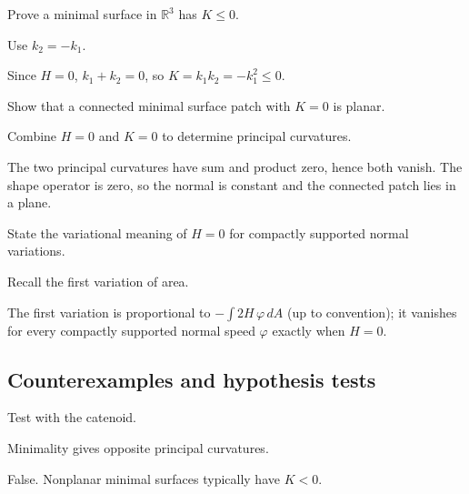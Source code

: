 \begin{exercise}\label{exr:vii19-ped-07}
Prove a minimal surface in \(\mathbb R^3\) has \(K\le0\).
\end{exercise}
\begin{hint}
Use \(k_2=-k_1\).
\end{hint}
\begin{solution}
Since \(H=0\), \(k_1+k_2=0\), so \(K=k_1k_2=-k_1^2\le0\).
\end{solution}

\begin{exercise}[Minimal and \(K=0\)]\label{exr:vii19-ped-08}
Show that a connected minimal surface patch with \(K=0\) is planar.
\end{exercise}
\begin{hint}
Combine \(H=0\) and \(K=0\) to determine principal curvatures.
\end{hint}
\begin{solution}
The two principal curvatures have sum and product zero, hence both vanish.  The shape operator is zero, so the normal is constant and the connected patch lies in a plane.
\end{solution}

\begin{exercise}\label{exr:vii19-ped-09}
State the variational meaning of \(H=0\) for compactly supported normal variations.
\end{exercise}
\begin{hint}
Recall the first variation of area.
\end{hint}
\begin{solution}
The first variation is proportional to \(-\int 2H\,\varphi\,dA\) (up to convention); it vanishes for every compactly supported normal speed \(\varphi\) exactly when \(H=0\).
\end{solution}

\subsection*{Counterexamples and hypothesis tests}

\begin{exercise}\label{exr:vii19-ped-10}
Test with the catenoid.
\end{exercise}
\begin{hint}
Minimality gives opposite principal curvatures.
\end{hint}
\begin{solution}
False.  Nonplanar minimal surfaces typically have \(K<0\).
\end{solution}

